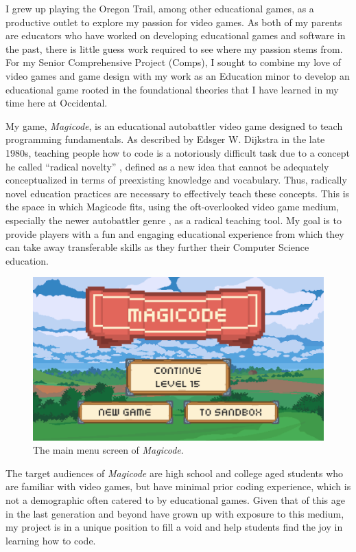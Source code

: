 \documentclass[10pt,twocolumn]{article}
\begin{document}
I grew up playing the Oregon Trail, among other educational games, as a productive outlet to explore my passion for video games. As both of my parents are educators who have worked on developing educational games and software in the past, there is little guess work required to see where my passion stems from. For my Senior Comprehensive Project (Comps), I sought to combine my love of video games and game design with my work as an Education minor to develop an educational game rooted in the foundational theories that I have learned in my time here at Occidental.

My game, \textit{Magicode}, is an educational autobattler video game designed to teach programming fundamentals. As described by Edsger W. Dijkstra in the late 1980s, teaching people how to code is a notoriously difficult task due to a concept he called “radical novelty” \cite{dijkstra-difficulty}, defined as a new idea that cannot be adequately conceptualized in terms of preexisting knowledge and vocabulary. Thus, radically novel education practices are necessary to effectively teach these concepts. This is the space in which Magicode fits, using the oft-overlooked video game medium, especially the newer autobattler genre \cite{autobattler-genre}, as a radical teaching tool. My goal is to provide players with a fun and engaging educational experience from which they can take away transferable skills as they further their Computer Science education.

\begin{figure}
    \centering
    \includegraphics[width=\linewidth]{images/screenshots/main_menu.png}
    \caption{The main menu screen of \textit{Magicode}.}
    \label{fig:main-menu}
\end{figure}

The target audiences of \textit{Magicode} are high school and college aged students who are familiar with video games, but have minimal prior coding experience, which is not a demographic often catered to by educational games. Given that of this age in the last generation and beyond have grown up with exposure to this medium, my project is in a unique position to fill a void and help students find the joy in learning how to code.
\end{document}
